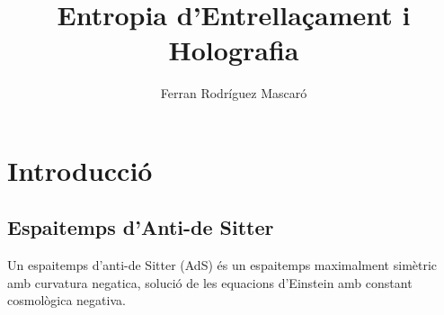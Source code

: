 \documentclass[lettersize,journal]{IEEEtran}
\title{Entropia d'Entrellaçament i Holografia}
\author{Ferran Rodríguez Mascaró}
\date{}
\begin{document}
\maketitle{}



\section{Introducció}


\subsection{Espaitemps d'Anti-de Sitter}

Un espaitemps d'anti-de Sitter (AdS) és un espaitemps maximalment simètric amb curvatura negatica, solució de les equacions d'Einstein amb constant cosmològica negativa.


\end{document}
